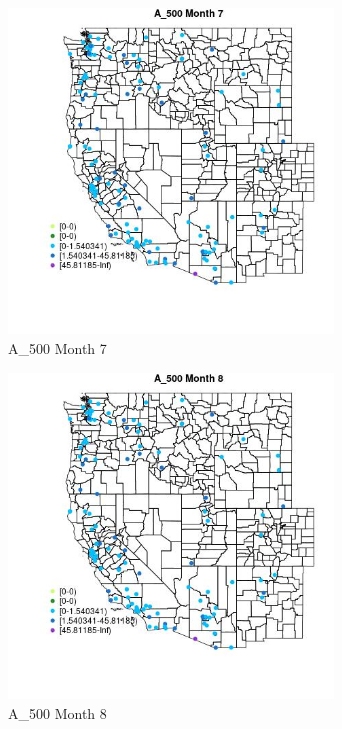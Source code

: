 \begin{figure} 
\centering  
\includegraphics[width=0.77\textwidth]{Code_Outputs/Report_ML_input_PM25_Step4_part_e_de_duplicated_aves_MapObsMo7A_500.jpg} 
\caption{\label{fig:Report_ML_input_PM25_Step4_part_e_de_duplicated_avesMapObsMo7A_500}A_500 Month 7} 
\end{figure} 
 

\begin{figure} 
\centering  
\includegraphics[width=0.77\textwidth]{Code_Outputs/Report_ML_input_PM25_Step4_part_e_de_duplicated_aves_MapObsMo8A_500.jpg} 
\caption{\label{fig:Report_ML_input_PM25_Step4_part_e_de_duplicated_avesMapObsMo8A_500}A_500 Month 8} 
\end{figure} 
 

